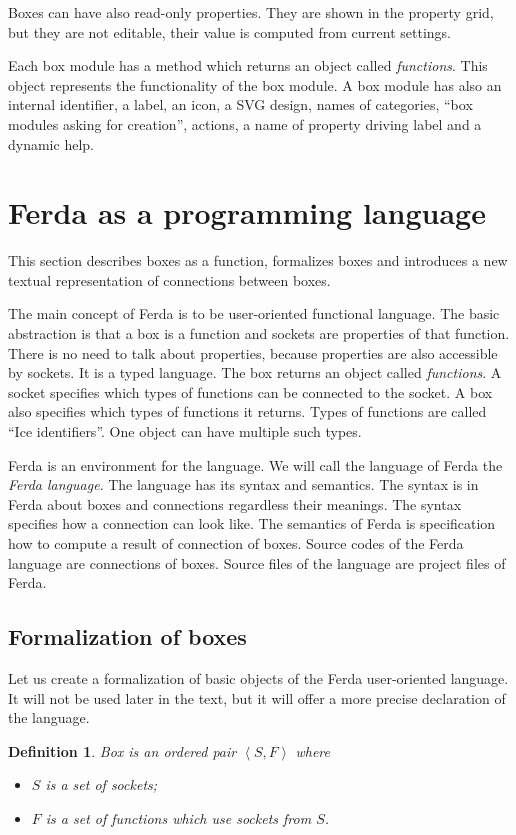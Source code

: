 \documentclass[a4paper,12pt]{book}
\begin{document}
Boxes can have also read-only properties. They are shown in the property grid, but they are not editable, their value is computed from current settings.

Each box module has a method which returns an object called \emph{functions}. This object represents the functionality of the box module. A box module has also an internal identifier, a label, an icon, a SVG design, names of categories, ``box modules asking for creation'', actions, a name of property driving label and a dynamic help.

\section{Ferda as a programming language}
\newtheorem{mydef}{Definition}

This section describes boxes as a function, formalizes boxes and introduces a new textual representation of connections between boxes.

The main concept of Ferda is to be user-oriented functional language. The basic abstraction is that a box is a function and sockets are properties of that function. There is no need to talk about properties, because properties are also accessible by sockets. It is a typed language. The box returns an object called \emph{functions}. A socket specifies which types of functions can be connected to the socket. A box also specifies which types of functions it returns. Types of functions are called ``Ice identifiers''. One object can have multiple such types.

Ferda is an environment for the language. We will call the language of Ferda the \emph{Ferda language}. The language has its syntax and semantics. The syntax is in Ferda about boxes and connections regardless their meanings. The syntax specifies how a connection can look like. The semantics of Ferda is specification how to compute a result of connection of boxes. Source codes of the Ferda language are connections of boxes. Source files of the language are project files of Ferda.

\subsection{Formalization of boxes}
Let us create a formalization of basic objects of the Ferda user-oriented language. It will not be used later in the text, but it will offer a more precise declaration of the language.

\begin{mydef}
\emph{Box} is an ordered pair $\left<S,F\right>$ where
\begin{itemize}
	\item $S$ is a set of sockets;
	\item $F$ is a set of functions which use sockets from $S$.
\end{itemize}
\end{mydef}
\end{document}
